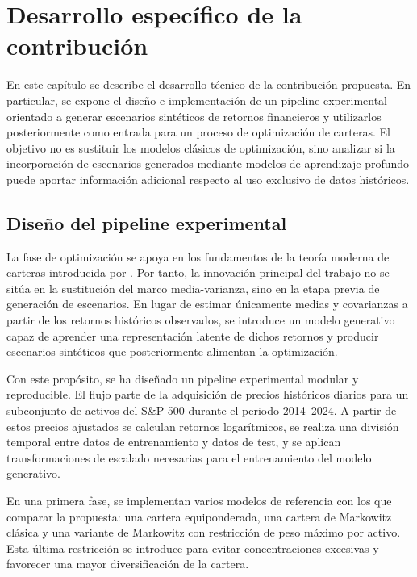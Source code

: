 \chapter{Desarrollo específico de la contribución}

En este capítulo se describe el desarrollo técnico de la contribución propuesta. En particular, se expone el diseño e implementación de un pipeline experimental orientado a generar escenarios sintéticos de retornos financieros y utilizarlos posteriormente como entrada para un proceso de optimización de carteras. El objetivo no es sustituir los modelos clásicos de optimización, sino analizar si la incorporación de escenarios generados mediante modelos de aprendizaje profundo puede aportar información adicional respecto al uso exclusivo de datos históricos.

\section{Diseño del pipeline experimental}

La fase de optimización se apoya en los fundamentos de la teoría moderna de carteras introducida por \cite{markowitz1952}. Por tanto, la innovación principal del trabajo no se sitúa en la sustitución del marco media-varianza, sino en la etapa previa de generación de escenarios. En lugar de estimar únicamente medias y covarianzas a partir de los retornos históricos observados, se introduce un modelo generativo capaz de aprender una representación latente de dichos retornos y producir escenarios sintéticos que posteriormente alimentan la optimización.

Con este propósito, se ha diseñado un pipeline experimental modular y reproducible. El flujo parte de la adquisición de precios históricos diarios para un subconjunto de activos del S\&P 500 durante el periodo 2014--2024. A partir de estos precios ajustados se calculan retornos logarítmicos, se realiza una división temporal entre datos de entrenamiento y datos de test, y se aplican transformaciones de escalado necesarias para el entrenamiento del modelo generativo.

En una primera fase, se implementan varios modelos de referencia con los que comparar la propuesta: una cartera equiponderada, una cartera de Markowitz clásica y una variante de Markowitz con restricción de peso máximo por activo. Esta última restricción se introduce para evitar concentraciones excesivas y favorecer una mayor diversificación de la cartera.

